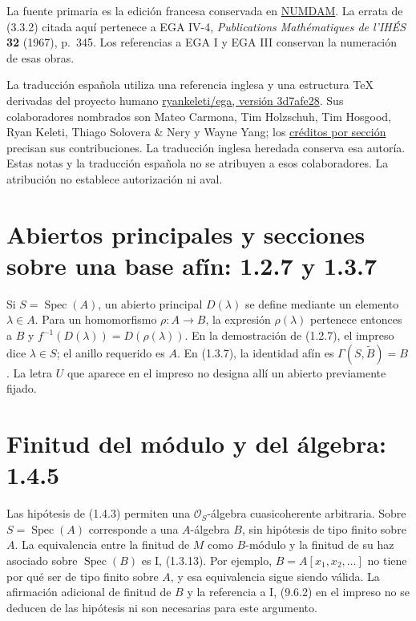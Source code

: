 \documentclass[11pt,a4paper]{article}
\DeclareMathOperator{\Spec}{Spec}
\begin{document}
La fuente primaria es la edición francesa conservada en
\href{https://numdam.org/item/PMIHES_1961__8__5_0/}{NUMDAM}.
La errata de (3.3.2) citada aquí pertenece a EGA IV-4,
\emph{Publications Mathématiques de l'IHÉS} \textbf{32} (1967),
p.~345. Los referencias a EGA I y EGA III conservan la numeración
de esas obras.

La traducción española utiliza una referencia inglesa y una
estructura TeX derivadas del proyecto humano
\href{https://github.com/ryankeleti/ega/tree/3d7afe28c99d1887ccdb85acf2ca1afd93fb1971}{ryankeleti/ega, versión 3d7afe28}.
Sus colaboradores nombrados son Mateo Carmona, Tim Holzschuh,
Tim Hosgood, Ryan Keleti, Thiago Solovera \& Nery y Wayne Yang;
los \href{https://github.com/ryankeleti/ega/blob/3d7afe28c99d1887ccdb85acf2ca1afd93fb1971/README.md}{créditos por sección}
precisan sus contribuciones. La traducción inglesa heredada
conserva esa autoría. Estas notas y la traducción española no
se atribuyen a esos colaboradores. La atribución no establece
autorización ni aval.


\section{Abiertos principales y secciones sobre una base afín: 1.2.7 y 1.3.7}
Si $S=\Spec(A)$, un abierto principal $D(\lambda)$ se define mediante
un elemento $\lambda\in A$. Para un homomorfismo $\rho:A\to B$,
la expresión $\rho(\lambda)$ pertenece entonces a $B$ y
$f^{-1}(D(\lambda))=D(\rho(\lambda))$. En la demostración de (1.2.7),
el impreso dice $\lambda\in S$; el anillo requerido es $A$.
En (1.3.7), la identidad afín es
$\Gamma(S,\widetilde B)=B$. La letra $U$ que aparece en el impreso
no designa allí un abierto previamente fijado.

\section{Finitud del módulo y del álgebra: 1.4.5}
Las hipótesis de (1.4.3) permiten una $\mathcal O_S$-álgebra
cuasicoherente arbitraria. Sobre $S=\Spec(A)$ corresponde a una
$A$-álgebra $B$, sin hipótesis de tipo finito sobre $A$.
La equivalencia entre la finitud de $M$ como $B$-módulo y la finitud
de su haz asociado sobre $\Spec(B)$ es I, (1.3.13).
Por ejemplo, $B=A[x_1,x_2,\ldots]$ no tiene por qué ser de tipo finito
sobre $A$, y esa equivalencia sigue siendo válida. La afirmación
adicional de finitud de $B$ y la referencia a I, (9.6.2) en el impreso
no se deducen de las hipótesis ni son necesarias para este argumento.
\end{document}
